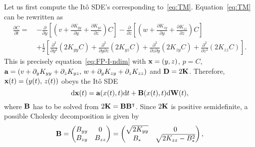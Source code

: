Let us first compute the Itô SDE's corresponding to~\eqref{eq:TM}. Equation~\eqref{eq:TM} can be rewritten as
\begin{align}
	\frac{\partial C}{\partial t} =~& -\frac{\partial}{\partial y}\left[\left(v+\frac{\partial K_{yy}}{\partial y} + \frac{\partial K_{yz}}{\partial z}\right)C\right] -\frac{\partial}{\partial z}\left[\left(w+\frac{\partial K_{zy}}{\partial y} + \frac{\partial K_{zz}}{\partial z}\right)C\right] \nonumber\\
	&+ \frac{1}{2}\left[\frac{\partial^2}{\partial y^2} \left(2K_{yy} C\right) + \frac{\partial^2}{\partial y \partial z} \left(2K_{yz} C\right) + \frac{\partial^2}{\partial z \partial y} \left(2K_{zy} C\right) + \frac{\partial^2}{\partial z^2} \left(2K_{zz} C\right) \right].
\end{align}
This is precisely equation~\eqref{eq:FP-I-ndim} with $\mathbf x =(y,z)$, $p=C$, $\mathbf a = (v+\partial_y K_{yy} + \partial_z K_{yz},\, w+\partial_y K_{zy} + \partial_z K_{zz})$ and $\mathbf D = 2\mathbf K$. Therefore, $\mathbf x(t) = (y(t),\, z(t))$ obeys the Itô SDE
\begin{equation} \label{eq:ito-TM-vec}
	\mathrm d \mathbf x(t) = \mathbf a(x(t),t) \mathrm dt + \mathbf B(x(t),t) \mathrm d \mathbf W(t),
\end{equation}
where $\mathbf B$ has to be solved from $2\mathbf K = \mathbf B \mathbf B^{\intercal}$. Since $2\mathbf K$ is positive semidefinite, a possible Cholesky decomposition is given by
\begin{equation} \label{eq:B}
	\mathbf B = \begin{pmatrix} B_{yy} & 0 \\ B_{zy} & B_{zz} \end{pmatrix} = \begin{pmatrix} \sqrt{2K_{yy}} & 0 \\ B_* & \sqrt{2K_{zz}-B_*^2} \end{pmatrix},
\end{equation}
